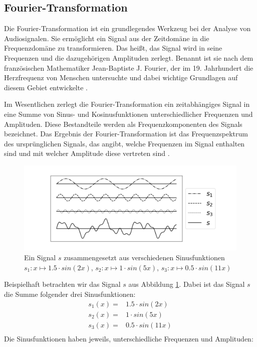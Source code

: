 \subsection{Fourier-Transformation}
Die Fourier-Transformation ist ein grundlegendes Werkzeug bei der Analyse von Audiosignalen. Sie ermöglicht ein Signal aus der Zeitdomäne in die Frequenzdomäne zu transformieren. Das heißt, das Signal wird in seine Frequenzen und die dazugehörigen Amplituden zerlegt. Benannt ist sie nach dem französischen Mathematiker Jean-Baptiste J. Fourier, der im 19. Jahrhundert die Herzfrequenz von Menschen untersuchte und dabei wichtige Grundlagen auf diesem Gebiet entwickelte \cite{Fourier1822}.

Im Wesentlichen zerlegt die Fourier-Transformation ein zeitabhängiges Signal in eine Summe von Sinus- und Kosinusfunktionen unterschiedlicher Frequenzen und Amplituden. 
Diese Bestandteile werden als Frequenzkomponenten des Signals bezeichnet. Das Ergebnis der Fourier-Transformation ist das Frequenzspektrum des ursprünglichen Signals, das angibt, welche Frequenzen im Signal enthalten sind und mit welcher Amplitude diese vertreten sind \cite{Wirsing2020}.

\begin{figure}[H]
    \centering
    \includegraphics[width=1\linewidth]{images/simple_signal.png}
    \caption[Beispiel Signal \(s\)] {Ein Signal \(s\) zusammengesetzt aus verschiedenen Sinusfunktionen \\ \(s_1 : x \mapsto 1.5 \cdot sin(2x)\), \(s_2 : x \mapsto 1 \cdot sin(5x)\), \(s_3 : x \mapsto 0.5 \cdot sin(11x)\)}
    \label{fig:simple_signal}
\end{figure}

Beispielhaft betrachten wir das Signal \(s\) aus Abbildung \ref{fig:simple_signal}.
Dabei ist das Signal \(s\) die Summe folgender drei Sinusfunktionen:
\begin{align*}
s_1(x) =& 1.5 \cdot sin(2x) \\
s_2(x) =& 1 \cdot sin(5x) \\
s_3(x) =& 0.5 \cdot sin(11x) \\
\end{align*}
Die Sinusfunktionen haben jeweils, unterschiedliche Frequenzen und Amplituden:

